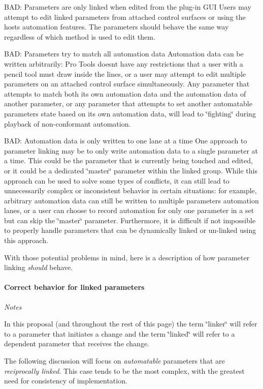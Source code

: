 \begin{DoxyItemize}
\item B\+A\+D\+: Parameters are only linked when edited from the plug-\/in G\+U\+I  Users may attempt to edit linked parameters from attached control surfaces or using the host\textquotesingle{}s automation features. The parameters should behave the same way regardless of which method is used to edit them.  
\item B\+A\+D\+: Parameters try to match all automation data  Automation data can be written arbitrarily\+: Pro Tools doesn\textquotesingle{}t have any restrictions that a user with a pencil tool must draw inside the lines, or a user may attempt to edit multiple parameters on an attached control surface simultaneously. Any parameter that attempts to match both its own automation data and the automation data of another parameter, or any parameter that attempts to set another automatable parameter\textquotesingle{}s state based on its own automation data, will lead to \char`\"{}fighting\char`\"{} during playback of non-\/conformant automation.  
\item B\+A\+D\+: Automation data is only written to one lane at a time  One approach to parameter linking may be to only write automation data to a single parameter at a time. This could be the parameter that is currently being touched and edited, or it could be a dedicated \char`\"{}master\char`\"{} parameter within the linked group. While this approach can be used to solve some types of conflicts, it can still lead to unnecessarily complex or inconsistent behavior in certain situations\+: for example, arbitrary automation data can still be written to multiple parameters\textquotesingle{} automation lanes, or a user can choose to record automation for only one parameter in a set but can skip the \char`\"{}master\char`\"{} parameter. Furthermore, it is difficult if not impossible to properly handle parameters that can be dynamically linked or un-\/linked using this approach.  
\end{DoxyItemize}

With those potential problems in mind, here is a description of how parameter linking {\itshape should} behave.\hypertarget{a00354_linkedParamters_behavior_correct}{}\paragraph{Correct behavior for linked parameters}\label{a00354_linkedParamters_behavior_correct}
{\itshape Notes}
\begin{DoxyItemize}
\item In this proposal (and throughout the rest of this page) the term \char`\"{}linker\char`\"{} will refer to a parameter that initiates a change and the term \char`\"{}linked\char`\"{} will refer to a dependent parameter that receives the change.
\item The following discussion will focus on {\itshape automatable} parameters that are {\itshape reciprocally linked}. This case tends to be the most complex, with the greatest need for consistency of implementation.
\end{DoxyItemize}

